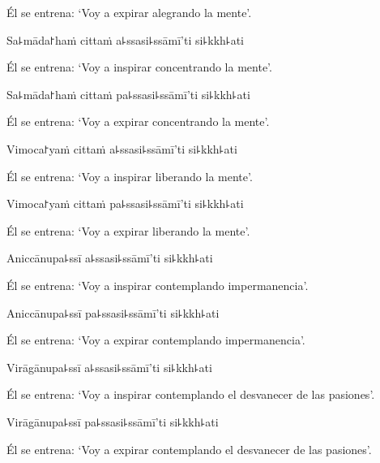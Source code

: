 \begin{english}
  Él se entrena: `Voy a expirar alegrando la mente'.
\end{english}

Sa꜕māda꜓haṁ cittaṁ a꜕ssasi꜕ssāmī'ti si꜕kkh꜕ati

\begin{english}
  Él se entrena: `Voy a inspirar concentrando la mente'.
\end{english}

Sa꜕māda꜓haṁ cittaṁ pa꜕ssasi꜕ssāmī'ti si꜕kkh꜕ati

\begin{english}
  Él se entrena: `Voy a expirar concentrando la mente'.
\end{english}

Vimoca꜓yaṁ cittaṁ a꜕ssasi꜕ssāmī'ti si꜕kkh꜕ati

\begin{english}
  Él se entrena: `Voy a inspirar liberando la mente'.
\end{english}

Vimoca꜓yaṁ cittaṁ pa꜕ssasi꜕ssāmī'ti si꜕kkh꜕ati

\begin{english}
  Él se entrena: `Voy a expirar liberando la mente'.
\end{english}

Aniccānupa꜕ssī a꜕ssasi꜕ssāmī'ti si꜕kkh꜕ati

\begin{english}
  Él se entrena: `Voy a inspirar contemplando impermanencia'.
\end{english}

Aniccānupa꜕ssī pa꜕ssasi꜕ssāmī'ti si꜕kkh꜕ati

\begin{english}
  Él se entrena: `Voy a expirar contemplando impermanencia'.
\end{english}

Virāgānupa꜕ssī a꜕ssasi꜕ssāmī'ti si꜕kkh꜕ati

\begin{english}
  Él se entrena: `Voy a inspirar contemplando el desvanecer de las pasiones'.
\end{english}

Virāgānupa꜕ssī pa꜕ssasi꜕ssāmī'ti si꜕kkh꜕ati

\begin{english}
  Él se entrena: `Voy a expirar contemplando el desvanecer de las pasiones'.
\end{english}


